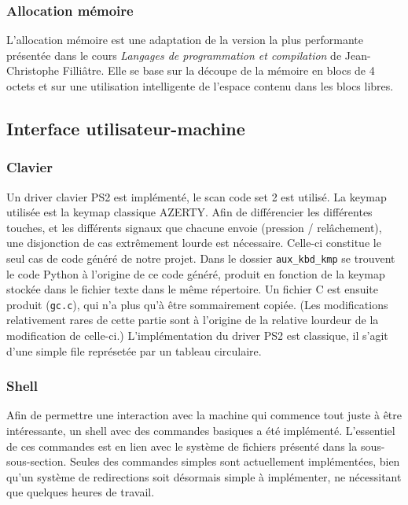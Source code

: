 \documentclass[a4paper, 11pt, twoside]{article}
\begin{document}
\subsubsection{Allocation mémoire}

L'allocation mémoire est une adaptation de la version la plus performante
présentée dans le cours \emph{Langages de programmation et compilation} de
Jean-Christophe Filliâtre. Elle se base sur la découpe de la mémoire en blocs de
4 octets et sur une utilisation intelligente de l'espace contenu dans les
blocs libres.

\subsection{Interface utilisateur-machine}

\subsubsection{Clavier}

Un driver clavier PS2 est implémenté, le scan code set 2 est utilisé. La keymap utilisée
est la keymap classique AZERTY. Afin de différencier les différentes touches, et les
différents signaux que chacune envoie (pression / relâchement), une disjonction de cas
extrêmement lourde est nécessaire. Celle-ci constitue le seul cas de code généré de notre
projet.
Dans le dossier \texttt{aux\_kbd\_kmp} se trouvent le code Python à l'origine de ce code généré,
produit en fonction de la keymap stockée dans le fichier texte dans le même répertoire.
Un fichier C est ensuite produit (\texttt{gc.c}), qui n'a plus qu'à être sommairement copiée.
(Les modifications relativement rares de cette partie sont à l'origine de la relative lourdeur
de la modification de celle-ci.)
L'implémentation du driver PS2 est classique, il s'agit d'une simple file représetée par un 
tableau circulaire.

\subsubsection{Shell}

Afin de permettre une interaction avec la machine qui commence tout juste à être intéressante, 
un shell avec des commandes basiques a été implémenté. L'essentiel de ces commandes est en lien 
avec le système de fichiers présenté dans la sous-sous-section.
Seules des commandes simples sont actuellement implémentées, bien qu'un système de redirections 
soit désormais simple à implémenter, ne nécessitant que quelques heures de travail.
\end{document}
